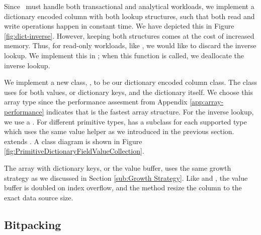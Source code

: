 Since \gap~must handle both transactional and analytical workloads, we implement a dictionary encoded column with both lookup structures, such that both read and write operations happen in constant time. We have depicted this in Figure \ref{fig:dict-inverse}. However, keeping both structures comes at the cost of increased memory. Thus, for read-only workloads, like \gd, we would like to discard the inverse lookup. We implement this in ; when this function is called, we deallocate the inverse lookup. 

We implement a new class, , to be our dictionary encoded column class. The class uses  for both values, or dictionary keys, and the dictionary itself. We choose this array type since the performance assesment from Appendix \ref{app:array-performance} indicates that  is the fastest array structure. For the inverse lookup, we use a . For different primitive types,  has a subclass for each supported type which uses the same value helper as we introduced in the previous section.  extends . A class diagram is shown in Figure \ref{fig:PrimitiveDictionaryFieldValueCollection}.

The array with dictionary keys, or the value buffer, uses the same growth strategy as we discussed in Section \ref{sub:Growth Strategy}. Like  and , the value buffer is doubled on index overflow, and the  method resize the column to the exact data source size.

\subsection{Bitpacking}
\label{compression:bitpacking}

